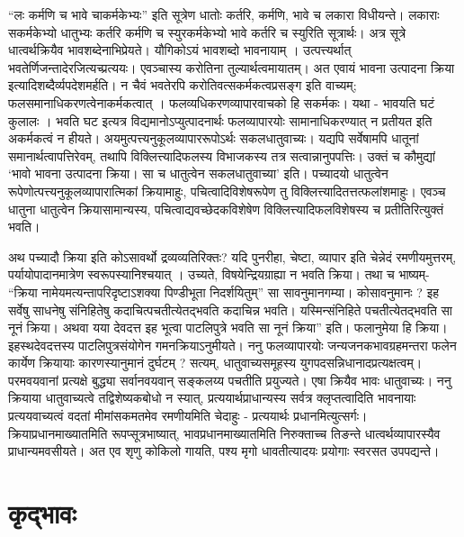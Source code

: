 {“लः कर्मणि च भावे चाकर्मकेभ्यः” इति सूत्रेण धातोः कर्तरि, कर्मणि, भावे च लकारा विधीयन्ते। लकाराः सकर्मकेभ्यो धातुभ्यः कर्तरि कर्मणि च स्युरकर्मकेभ्यो भावे कर्तरि च स्युरिति सूत्रार्थः। अत्र सूत्रे धात्वर्थक्रियैव भावशब्देनाभिप्रेयते। यौगिकोऽयं भावशब्दो भावनायाम् । उत्पत्त्यर्थात् भवतेर्णिजन्तादेरजित्यच्प्रत्ययः। एवञ्चास्य करोतिना तुल्यार्थत्वमायातम्। अत एवायं भावना उत्पादना क्रिया इत्यादिशब्दैर्व्यपदेशमर्हति। न चैवं भवतेरपि करोतिवत्सकर्मकत्वप्रसङ्ग इति वाच्यम्; फलसमानाधिकरणत्वेनाकर्मकत्वात् । फलव्यधिकरणव्यापारवाचको हि सकर्मकः। यथा - भावयति घटं कुलालः । भवति घट इत्यत्र विद्यमानोऽप्युत्पादनार्थः फलव्यापारयोः सामानाधिकरण्यात् न प्रतीयत इति अकर्मकत्वं न हीयते। अयमुत्पत्त्यनुकूलव्यापाररूपोऽर्थः सकलधातुवाच्यः। यद्यपि सर्वेषामपि धातूनां समानार्थत्वापत्तिरेवम्, तथापि विक्लित्त्यादिफलस्य विभाजकस्य तत्र सत्वान्नानुपपत्तिः। उक्तं च कौमुद्यां ‘भावो भावना उत्पादना क्रिया। सा च धातुत्वेन सकलधातुवाच्या’ इति। पच्यादयो धातुत्वेन रूपेणोत्पत्त्यनुकूलव्यापारात्मिकां क्रियामाहुः, पचित्वादिविशेषरूपेण तु विक्लित्त्यादितत्तत्फलांशमाहुः। एवञ्च धातुना धातुत्वेन क्रियासामान्यस्य, पचित्वाद्यवच्छेदकविशेषेण विक्लित्त्यादिफलविशेषस्य च प्रतीतिरित्युक्तं भवति।

अथ पच्यादौ क्रिया इति कोऽसावर्थो द्रव्यव्यतिरिक्तः? यदि पुनरीहा, चेष्टा, व्यापार इति चेन्नेदं रमणीयमुत्तरम्, पर्यायोपादानमात्रेण स्वरूपस्यानिश्चयात् । उच्यते, विषयेन्द्रियग्राह्या न भवति क्रिया। तथा च भाष्यम्-  “क्रिया नामेयमत्यन्तापरिदृष्टाऽशक्या पिण्डीभूता निदर्शयितुम्” सा सावनुमानगम्या। कोसावनुमानः ? इह सर्वेषु साधनेषु संनिहितेषु कदाचित्पचतीत्येतद्भवति कदाचिन्न भवति। यस्मिन्संनिहिते पचतीत्येतद्भवति सा नूनं क्रिया। अथवा यया देवदत्त इह भूत्वा पाटलिपुत्रे भवति सा नूनं क्रिया” इति। फलानुमेया हि क्रिया। इहस्थदेवदत्तस्य पाटलिपुत्रसंयोगेन गमनक्रियाऽनुमीयते। ननु फलव्यापारयोः जन्यजनकभावग्रहमन्तरा फलेन कार्येण क्रियायाः कारणस्यानुमानं दुर्घटम् ? सत्यम्, धातुवाच्यसमूहस्य युगपदसन्निधानादप्रत्यक्षत्वम्।परमवयवानां प्रत्यक्षे बुद्ध्या सर्वानवयवान् सङ्कलय्य पचतीति प्रयुज्यते। एषा क्रियैव भावः धातुवाच्यः। ननु क्रियाया धातुवाच्यत्वे तद्विशेष्यकबोधो न स्यात्, प्रत्ययार्थप्राधान्यस्य सर्वत्र क्लृप्तत्वादिति भावनायाः प्रत्ययवाच्यत्वं वदतां मीमांसकमतमेव रमणीयमिति चेदाहुः - प्रत्ययार्थः प्रधानमित्युत्सर्गः। क्रियाप्रधानमाख्यातमिति रूपप्सूत्रभाष्यात्, भावप्रधानमाख्यातमिति निरुक्ताच्च तिङन्ते धात्वर्थव्यापारस्यैव प्राधान्यमवसीयते। अत एव शृणु कोकिलो गायति, पश्य मृगो धावतीत्यादयः प्रयोगाः स्वरसत उपपद्यन्ते।

\section*{कृद्भावः} 

}
